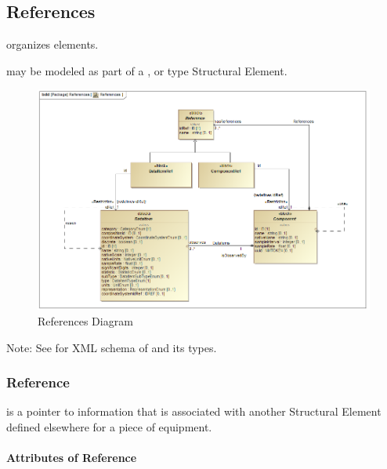 \subsection{References} \label{sec:References}


 \glspl{organize}  elements.

 may be modeled as part of a ,  or  type \gls{Structural Element}.

\begin{figure}[ht]
  \centering
    \includegraphics[width=1.0\textwidth]{figures/References.png}
  \caption{References Diagram}
  \label{fig:References Diagram}
\end{figure}

\FloatBarrier


Note: See  for XML schema of  and its types.


\subsubsection{Reference}
\label{sec:Reference}



 is a pointer to information that is associated with another \gls{Structural Element} defined elsewhere for a piece of equipment.


\paragraph{Attributes of Reference}\mbox{}
\label{sec:Attributes of Reference}

